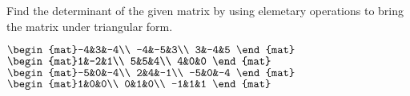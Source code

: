 
\begin{Exercise}[
name={},
title={}, 
difficulty=0,
origin={\cite{GH}}]
Find the determinant of the given matrix by using elemetary operations to bring the matrix
under triangular form.
\begin{multicols}{2}
\Question $\begin{mat}-4&3&-4\\  -4&-5&3\\  3&-4&5 \end{mat}$
\Question $\begin{mat}1&-2&1\\  5&5&4\\  4&0&0 \end{mat}$
\Question $\begin{mat}-5&0&-4\\  2&4&-1\\  -5&0&-4 \end{mat}$
\Question $\begin{mat}1&0&0\\  0&1&0\\  -1&1&1 \end{mat}$

\end{multicols}
\end{Exercise}
